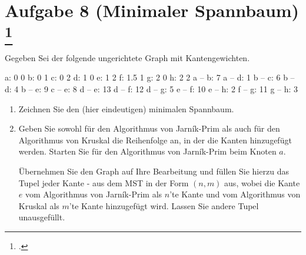\documentclass{bschlangaul-aufgabe}
\begin{document}
\section{Aufgabe 8 (Minimaler Spannbaum)
\footcite{examen:66115:2019:09}}

Gegeben Sei der folgende ungerichtete Graph mit Kantengewichten.

\begin{liGraphenFormat}
a: 0 0
b: 0 1
c: 0 2
d: 1 0
e: 1 2
f: 1.5 1
g: 2 0
h: 2 2
a -- b: 7
a -- d: 1
b -- c: 6
b -- d: 4
b -- e: 9
c -- e: 8
d -- e: 13
d -- f: 12
d -- g: 5
e -- f: 10
e -- h: 2
f -- g: 11
g -- h: 3
\end{liGraphenFormat}

\begin{center}
\end{center}

\begin{enumerate}

\item Zeichnen Sie den (hier eindeutigen) minimalen Spannbaum.


\item Geben Sie sowohl für den Algorithmus von Jarník-Prim als auch für
den Algorithmus von Kruskal die Reihenfolge an, in der die Kanten
hinzugefügt werden. Starten Sie für den Algorithmus von Jarník-Prim beim
Knoten $a$.

Übernehmen Sie den Graph auf Ihre Bearbeitung und füllen Sie hierzu das
Tupel jeder Kante - aus dem MST in der Form $(n, m)$ aus, wobei die
Kante $e$ vom Algorithmus von Jarník-Prim als $n$’te Kante und vom
Algorithmus von Kruskal als $m$’te Kante hinzugefügt wird. Lassen Sie
andere Tupel unausgefüllt.
\end{enumerate}
\end{document}
